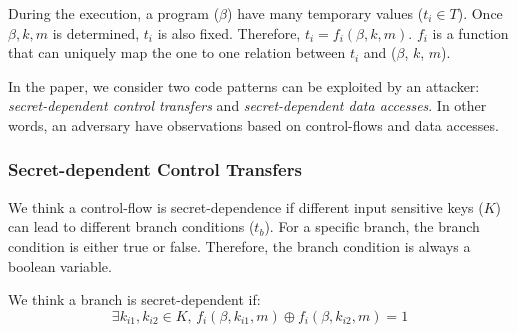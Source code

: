 During the execution, a program ($\beta$) have many temporary values ($t_i \in T$).
Once $\beta, k, m$ is determined,  $t_i$ is also fixed. Therefore, 
$ t_i = f_i(\beta, k, m)$.
$f_ i$ is a function that can uniquely map the one to one relation 
between $t_i$ and ($\beta$, $k$, $m$). 

In the paper, we consider two code patterns can be exploited by an attacker:
\emph{secret-dependent control transfers} and \emph{secret-dependent data accesses}.
In other words, an adversary have observations based on control-flows and
data accesses.

\subsubsection{Secret-dependent Control Transfers}
We think a control-flow is secret-dependence if different input sensitive keys ($K$)
can lead to different branch conditions ($t_{b}$). For a specific branch, the branch
condition is either true or false. Therefore, the branch condition is always a
boolean variable. 

We think a branch is secret-dependent if:
$$\exists k_{i1}, k_{i2} \in K, \,f_i(\beta, k_{i1}, m) \oplus f_i(\beta, k_{i2}, m) = 1 $$

